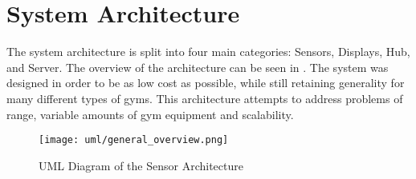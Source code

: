 \documentclass[PPFS.tex]{template/subfiles}
\begin{document}
\begin{comment}
    ----- Problem Statement -----
    It is helpful to provide a very simple block diagram of your project very early in the report to provide a
    graphical view that helps the reader understand. This diagram should focus on the interface(s) to your
    project. You may even show your project as a single block. This diagram can be more stylized (perhaps
    with clip art) to get the main idea across to the reader.

    When you get to sections that explain your design process, start with the design of the system
    architecture. This is where you provide a detailed block diagram of your system. Be sure to justify your
    approach. Why did you break down the functionality of the system into the blocks as you did? Were
    there alternative ways to do it?

    In many cases, you may also include a block diagram of the hardware and a separate block diagram of the
    software (and perhaps a system block diagram to show how the two relate). Many teams make the
    mistake of describing the software with very little detail. It is highly recommended that you include a
    block diagram of your software, preferably using the Uniform Modeling Language (UML).
\end{comment}

\section{System Architecture}

The system architecture is split into four main categories: Sensors, Displays, Hub, and Server. The overview of the architecture can be seen in . The system was designed in order to be as low cost as possible, while still retaining generality for many different types of gyms. This architecture attempts to address problems of range, variable amounts of gym equipment and scalability.

\begin{figure}[H]
    \centering
    \texttt{[image: uml/general\_overview.png]}
    \caption{UML Diagram of the Sensor Architecture}
    \label{fig:general_overview}
\end{figure}
\end{document}
